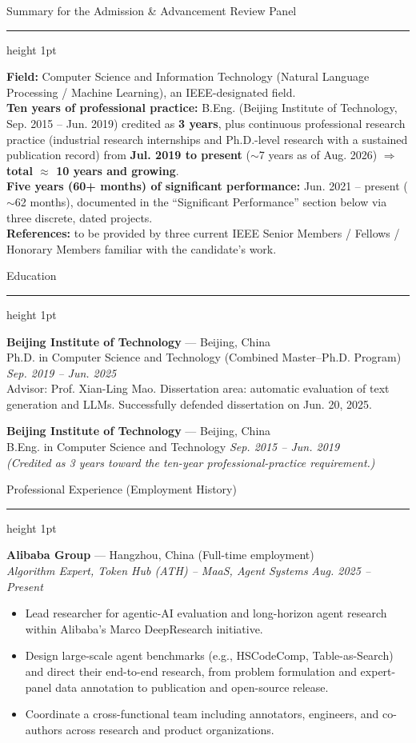 \documentclass[10.5pt]{article}
\newcommand{\cvsection}[1]{%
  \vspace{10pt}
  {\color{accent}\headingfont\Large #1}\par
  \vspace{2pt}
  {\color{accent}\hrule height 1pt}
  \vspace{6pt}
}
\begin{document}
\cvsection{Summary for the Admission \& Advancement Review Panel}
\textbf{Field:} Computer Science and Information Technology (Natural Language Processing / Machine Learning), an IEEE-designated field.\\
\textbf{Ten years of professional practice:} B.Eng. (Beijing Institute of Technology, Sep. 2015 -- Jun. 2019) credited as \textbf{3 years}, plus continuous professional research practice (industrial research internships and Ph.D.-level research with a sustained publication record) from \textbf{Jul. 2019 to present} ($\sim$7 years as of Aug. 2026) $\Rightarrow$ \textbf{total $\approx$ 10 years and growing}.\\
\textbf{Five years (60+ months) of significant performance:} Jun. 2021 -- present ($\sim$62 months), documented in the ``Significant Performance'' section below via three discrete, dated projects.\\
\textbf{References:} to be provided by three current IEEE Senior Members / Fellows / Honorary Members familiar with the candidate's work.

\cvsection{Education}

\textbf{Beijing Institute of Technology} --- Beijing, China\\
Ph.D. in Computer Science and Technology (Combined Master--Ph.D. Program) \hfill \textit{Sep. 2019 -- Jun. 2025}\\
Advisor: Prof. Xian-Ling Mao. Dissertation area: automatic evaluation of text generation and LLMs. Successfully defended dissertation on Jun. 20, 2025.

\vspace{4pt}
\textbf{Beijing Institute of Technology} --- Beijing, China\\
B.Eng. in Computer Science and Technology \hfill \textit{Sep. 2015 -- Jun. 2019}\\
\textit{(Credited as 3 years toward the ten-year professional-practice requirement.)}

\cvsection{Professional Experience (Employment History)}

\textbf{Alibaba Group} --- Hangzhou, China {\small\color{accent}(Full-time employment)}\\
\textit{Algorithm Expert, Token Hub (ATH) -- MaaS, Agent Systems} \hfill \textit{Aug. 2025 -- Present}
\begin{itemize}
  \item Lead researcher for agentic-AI evaluation and long-horizon agent research within Alibaba's Marco DeepResearch initiative.
  \item Design large-scale agent benchmarks (e.g., HSCodeComp, Table-as-Search) and direct their end-to-end research, from problem formulation and expert-panel data annotation to publication and open-source release.
  \item Coordinate a cross-functional team including annotators, engineers, and co-authors across research and product organizations.
\end{itemize}
\end{document}

